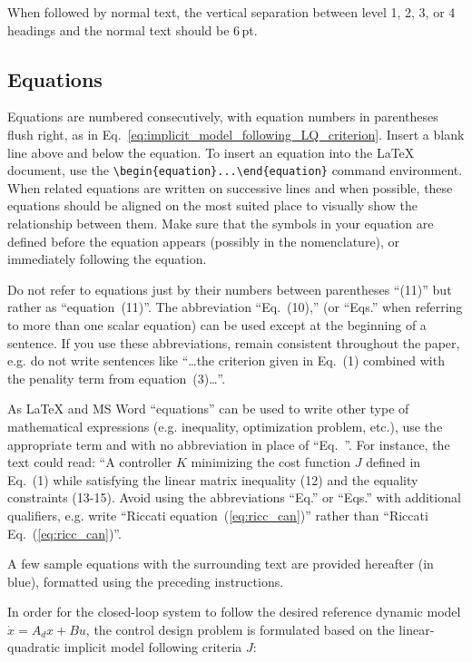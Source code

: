 \documentclass{CEAS_EuroGNC_2024}
\begin{document}
When followed by normal text, the vertical separation between level 1, 2, 3, or 4 headings and the normal text should be 6\,pt.





\subsection{Equations}


Equations are numbered consecutively, with equation numbers in parentheses flush right, as in Eq.~\eqref{eq:implicit_model_following_LQ_criterion}. Insert a blank line above and below the equation. To insert an equation into the \LaTeX{} document, use the \verb|\begin{equation}...\end{equation}| command environment. When related equations are written on successive lines and when possible, these equations should be aligned on the most suited place to visually show the relationship between them. Make sure that the symbols in your equation are defined before the equation appears (possibly in the nomenclature), or immediately following the equation.

Do not refer to equations just by their numbers between parentheses ``(11)'' but rather as ``equation~(11)''. The abbreviation ``Eq.~(10),'' (or ``Eqs.'' when referring to more than one scalar equation) can be used except at the beginning of a sentence. If you use these abbreviations, remain consistent throughout the paper, e.g. do not write sentences like ``\dots the criterion given in Eq.~(1) combined with the penality term from equation~(3)\dots''.

As \LaTeX{} and MS Word ``equations'' can be used to write other type of mathematical expressions (e.g. inequality, optimization problem, etc.), use the appropriate term and with no abbreviation in place of ``Eq.~''. For instance, the text could read: ``A controller $K$ minimizing the cost function $J$ defined in Eq.~(1) while satisfying the linear matrix inequality (12) and the equality constraints (13-15). Avoid using the abbreviations ``Eq.'' or ``Eqs.'' with additional qualifiers, e.g. write ``Riccati equation~(\ref{eq:ricc_can})'' rather than ``Riccati Eq.~(\ref{eq:ricc_can})''.


A few sample equations with the surrounding text are provided hereafter (in blue), formatted using the preceding instructions. 


\color{blue}
In order for the closed-loop system to follow the desired reference dynamic model $\dot{x} = A_d x + B u$, the control design problem is formulated based on the linear-quadratic implicit model following criteria $J$:
\end{document}

